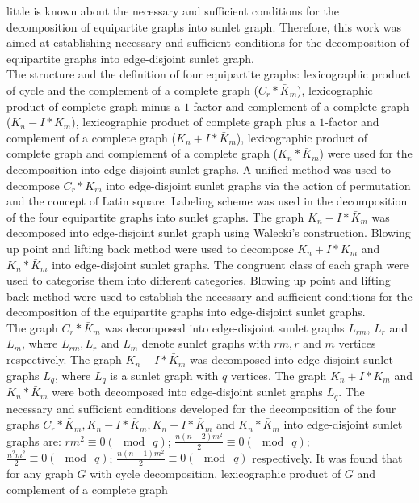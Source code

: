 \documentclass[12pt]{report}
\begin{document}
little is known about the necessary and sufficient
conditions for the decomposition of equipartite graphs into sunlet
graph. Therefore, this work was aimed at establishing necessary and
sufficient conditions for the decomposition of equipartite
graphs into edge-disjoint sunlet graph.\\
The structure and the definition of four equipartite graphs:
lexicographic product of cycle and the complement of a complete
graph ($C_r*\bar{K}_m$), lexicographic product of complete graph
minus a $1$-factor and  complement of a complete graph
($K_n-I*\bar{K}_m$), lexicographic product of complete graph plus a
$1$-factor and complement of a complete graph
($K_n+I*\bar{K}_m$), lexicographic product of complete graph and
complement of a complete graph ($K_n*\bar{K}_m$) were used for the
decomposition into edge-disjoint sunlet graphs. A unified method was
used to decompose $C_r*\bar{K}_m$ into edge-disjoint sunlet graphs
via the action of permutation and the concept of Latin square.
Labeling scheme was used in the decomposition of the four
equipartite graphs into sunlet graphs. The graph $K_n-I*\bar{K}_m$
was decomposed into edge-disjoint sunlet graph using Walecki's
construction. Blowing up point and lifting back method were used to
decompose $K_n+I*\bar{K}_m$ and $K_n*\bar{K}_m$ into edge-disjoint
sunlet graphs. The congruent class of each  graph were used to
categorise them into different categories. Blowing up point and
lifting back method were used to establish the necessary and
sufficient conditions for the decomposition of the equipartite
graphs into edge-disjoint sunlet graphs.\\
The graph $C_r*\bar{K}_m$ was decomposed into edge-disjoint sunlet
graphs $L_{rm}$, $L_r$ and $L_m$, where $L_{rm},L_r$ and $L_m$
denote sunlet graphs with $rm,r$ and $m$ vertices respectively. The
graph $K_n-I*\bar{K}_m$ was decomposed into edge-disjoint sunlet
graphs $L_q$, where $L_q$ is a sunlet graph with $q$ vertices. The
graph $K_n+I*\bar{K}_m$ and $K_n*\bar{K}_m$ were both decomposed
into edge-disjoint sunlet graphs $L_q$. The necessary and sufficient
conditions developed for the decomposition of the four graphs
$C_r*\bar{K}_m, K_n-I*\bar{K}_m,K_n+I*\bar{K}_m$ and $K_n*\bar{K}_m$
into edge-disjoint sunlet graphs are: $rm^2\equiv 0(\mod\ q)$;
$\displaystyle{\frac{n(n-2)m^2}{2}}\equiv 0(\mod\ q)$;
$\displaystyle{\frac{n^2m^2}{2}}\equiv 0(\mod\ q)$;
$\displaystyle{\frac{n(n-1)m^2}{2}}\equiv 0(\mod\ q)$ respectively.
It was found that for any graph $G$ with cycle decomposition,
lexicographic product of $G$ and complement of a complete graph
\end{document}

